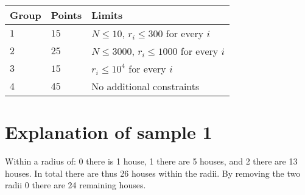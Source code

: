 \noindent
\begin{tabular}{| l | l | p{12cm} |}
  \hline
  Group & Points & Limits \\ \hline
  $1$    & $15$       &  $N \leq 10$, $r_i \leq 300$ for every $i$  \\ \hline 
  $2$    & $25$       &  $N \leq 3000$, $r_i \leq 1000$ for every $i$ \\ \hline
  $3$    & $15$       &  $r_i \leq 10^4$ for every $i$ \\ \hline
  $4$    & $45$       &  No additional constraints \\ \hline
\end{tabular}

\section*{Explanation of sample 1}
\noindent
Within a radius of: 0 there is 1 house, 1 there are 5 houses, and 2 there are 13 houses. In total
there are thus 26 houses within the radii. By removing the two radii 0 there are 24 remaining
houses.
